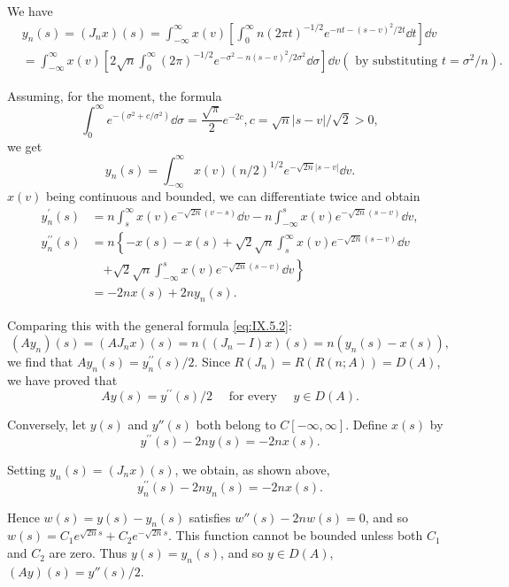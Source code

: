 We have 
\[
\begin{aligned}
&y _{n} (s) = (J _{n} x) (s) = \int_{- \infty} ^{\infty} x (v) \left[ \int_{0} ^{\infty} n (2 \pi t) ^{-1/2} e ^ {- n t - (s - v) ^{2} / 2 t} \dd t \right] \dd v
\\
&= \int_{- \infty} ^{\infty} x (v) \left[ 2 \sqrt {n} \int_{0} ^{\infty} (2 \pi) ^{-1/2} e ^ {- \sigma^{2} - n (s - v) ^{2} / 2 \sigma^{2}} \dd \sigma \right] \dd v (\text{ by substituting } t = \sigma^{2} / n).
\end{aligned}
\]

Assuming, for the moment, the formula 
\begin{equation}\label{eq:IX.5.3}
\int_{0} ^{\infty} e ^ {- (\sigma^{2} + c / \sigma^{2})} \dd \sigma = \frac {\sqrt {\pi}}{2} e ^{-2c}, c = \sqrt {n} | s - v | / \sqrt {2} > 0,
\end{equation}
we get 
\[
y _{n} (s) = \int_{- \infty} ^{\infty} x (v) (n / 2) ^{1/2} e ^ {- \sqrt {2 n} | s - v |} \dd v.
\]
$x(v)$ being continuous and bounded, we can differentiate twice and obtain 
\[
\begin{aligned}
y _{n} ^{\prime} (s) &= n \int_{s} ^{\infty} x (v) e ^ {- \sqrt {2 n} (v - s)} \dd v - n \int_{- \infty} ^{s} x (v) e ^ {- \sqrt {2 n} (s - v)} \dd v,
\\
y _{n} ^{\prime \prime} (s) &= n \left\{- x (s) - x (s) + \sqrt {2} \sqrt {n} \int_{s} ^{\infty} x (v) e ^ {- \sqrt {2 n} (s - v)} \dd v \right.
\\
&\quad \left. + \sqrt {2} \sqrt {n} \int_{- \infty} ^{s} x (v) e ^ {- \sqrt {2 n} (s - v)} \dd v \right\}
\\
&= - 2 n x (s) + 2 n y _{n} (s).
\end{aligned}
\]

Comparing this with the general formula \eqref{eq:IX.5.2}: 
\[
(A y _{n}) (s) = (A J _{n} x) (s) = n ((J _{n} - I) x) (s) = n (y _{n} (s) - x (s)),
\]
we find that $A y_{n}(s) = y_{n}^{\prime \prime}(s) / 2$. Since $R(J_{n}) = R(R(n;A)) = D(A)$, we  
have proved that 
\[
A y (s) = y ^{\prime \prime} (s) / 2 \quad \text{ for every } \quad y \in D (A).
\]

Conversely, let $y(s)$ and $y''(s)$ both belong to $C[-\infty, \infty]$. Define $x(s)$ by 
\[
y ^{\prime \prime} (s) - 2 n y (s) = - 2 n x (s).
\]

Setting $y_{n}(s) = (J_{n}x)(s)$, we obtain, as shown above, 
\[
y _{n} ^{\prime \prime} (s) - 2 n y _{n} (s) = - 2 n x (s).
\]

Hence $w(s) = y(s) - y_n(s)$ satisfies $w''(s) - 2nw(s) = 0$, and so $w(s) = C_1 e^{\sqrt{2n}s} + C_2 e^{-\sqrt{2n}s}$. This function cannot be bounded unless both $C_1$ and $C_2$ are zero. Thus $y(s) = y_n(s)$, and so $y \in D(A)$, $(Ay)(s) = y''(s)/2$. 

